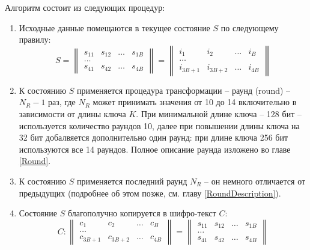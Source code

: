     Алгоритм состоит из следующих процедур:
    \begin{enumerate}
        \item Исходные данные помещаются в текущее состояние $S$ по следующему правилу:
            \begin{equation}
                S =
                \begin{Vmatrix}
                    s_{11} & s_{12} & \dots & s_{1B} \\
                    \dots \\
                    s_{41} & s_{42} & \dots & s_{4B}
                \end{Vmatrix} =
                \begin{Vmatrix}
                    i_{1} & i_{2} & \dots & i_{B} \\
                    \dots \\
                    i_{3B + 1} & i_{3B + 2} & \dots & i_{4B}
                \end{Vmatrix}
            \end{equation}

        \item К состоянию $S$ применяется процедура трансформации -- раунд (round) --  $N_R - 1$ раз,
        где $N_R$ может принимать значения от 10 до 14 включительно в зависимости от длины ключа $K$.
        При минимальной длине ключа -- 128 бит -- используется количество раундов 10, далее при повышении
        длины ключа на 32 бит добалвяется дополнительно один раунд: при длине ключа 256 бит
        используются все 14 раундов. Полное описание раунда изложено во главе \ref{Round}.

        \item К состоянию $S$ применяется последний раунд $N_R$ -- он немного отличается от предыдущих
        (подробнее об этом позже, см. главу \ref{RoundDescription}).

        \item Состояние $S$ благополучно копируется в шифро-текст $C$:
        \begin{equation}
            C:
            \begin{Vmatrix}
                c_{1} & c_{2} & \dots & c_{B} \\
                \dots \\
                c_{3B + 1} & c_{3B + 2} & \dots & c_{4B}
            \end{Vmatrix} =
            \begin{Vmatrix}
                s_{11} & s_{12} & \dots & s_{1B} \\
                \dots \\
                s_{41} & s_{42} & \dots & s_{4B}
            \end{Vmatrix}
        \end{equation}
    \end{enumerate}

